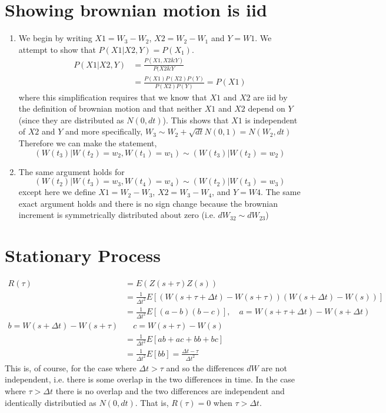 \documentclass{article}
\begin{document}
\section{Showing brownian motion is iid}
    \begin{enumerate}[label=\roman*)]
        \item We begin by writing $X1 = W_3 - W_2$, $X2 = W_2 - W_1$ and $Y =
        W1$. 
        We attempt to show that $P(X1|X2,Y) = P(X_1)$. 
        \begin{align*}
            P(X1|X2,Y) &= \frac{P(X1,X2 \& Y)}{P(X2 \& Y}
            \\
            &= \frac{P(X1)P(X2)P(Y)}{P(X2)P(Y)} = P(X1)
        \end{align*}
        where this simplification requires that we know that $X1$ and $X2$ are
        iid by the definition of brownian motion and that neither $X1$ and $X2$
        depend on $Y$ (since they are distributed as $N(0,dt)$). 
        This shows that $X1$ is independent of $X2$ and $Y$ and more
        specifically, 
        $W_3 \sim W_2 + \sqrt{dt}N(0,1) = N(W_2,dt)$
        Therefore we can make the statement, 
        \[(W(t_3)|W(t_2) = w_2, W(t_1) = w_1) \sim (W(t_3)|W(t_2) = w_2)\]
        \item The same argument holds for 
        \[(W(t_2)|W(t_3) = w_3, W(t_4) = w_4) \sim (W(t_2)|W(t_3) = w_3)\]
        except here we define $X1 = W_2 - W_3$, $X2 = W_3 - W_4$, and $Y = W4$.
        The same exact argument holds and there is no sign change because the
        brownian increment is symmetrically distributed about zero (i.e. $dW_{32}
        \sim dW_{23}$)
    \end{enumerate}

\section{Stationary Process}
    \begin{align*}
        R(\tau) &= E(Z(s+\tau)Z(s))
        \\
        &= \frac{1}{\Delta t^2}E\left[
        (W(s + \tau + \Delta t)-W(s + \tau))(W(s + \Delta t)-W(s))\right]
        \\
        &= \frac{1}{\Delta t^2}E\left[
        (a - b)(b - c)\right],\quad a = W(s + \tau + \Delta t)-W(s + \Delta t)
        \\
        b = W(s + \Delta t) - W(s + \tau) & \quad c = W(s + \tau) - W(s)
        \\
        &= \frac{1}{\Delta t^2}E\left[ab + ac + bb + bc\right]
        \\
        &= \frac{1}{\Delta t^2}E\left[bb\right] = \frac{\Delta t - \tau}{\Delta
        t^2}
    \end{align*}
    This is, of course, for the case where $\Delta t > \tau$ and so the
    differences $dW$ are not independent, i.e. there is some overlap in the two
    differences in time. In the case where $\tau > \Delta t$ there is no overlap
    and the two differences are independent and identically distributied as
    $N(0,dt)$. That is, $R(\tau) = 0$ when $\tau > \Delta t$. 
\end{document}
